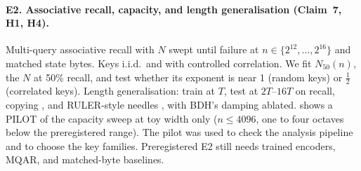 \documentclass[10pt]{article}
\theoremstyle{remark}
\begin{document}
\paragraph{E2. Associative recall, capacity, and length generalisation (Claim~7, H1, H4).} Multi-query associative
recall \citep{arora2023zoology} with $N$ swept until failure at $n\in\{2^{12},\dots,2^{16}\}$ and matched state bytes.
Keys i.i.d.\ and with controlled correlation. We fit $N_{50}(n)$, the $N$ at 50\% recall, and test whether its
exponent is near 1 (random keys) or $\tfrac12$ (correlated keys). Length generalisation: train at $T$, test at
$2T$--$16T$ on recall, copying \citep{jelassi2024repeat}, and RULER-style needles \citep{hsieh2024ruler}, with BDH's
damping ablated.  shows a PILOT of the capacity sweep at toy width only ($n\le4096$, one to four
octaves below the preregistered range). The pilot was used to check the analysis pipeline and to choose the key
families. Preregistered E2 still needs trained encoders, MQAR, and matched-byte baselines.
\end{document}
